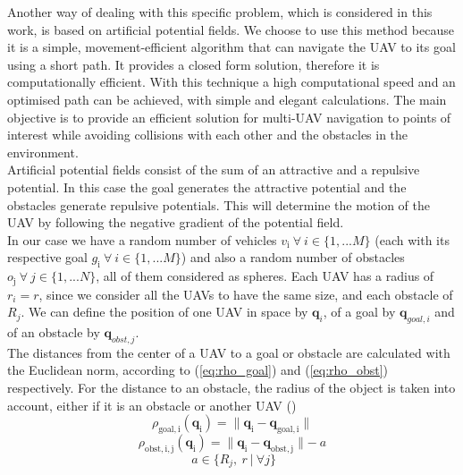 \documentclass[journal]{IEEEtran}
\newcommand*{\subb}[1]{_{\mathrm{#1}}}
\begin{document}
		Another way of dealing with this specific problem, which is considered in this work, is based on artificial potential fields. We choose to use this method because it is a simple, movement-efficient algorithm that can navigate the UAV to its goal using a short path. It provides a closed form solution, therefore it is computationally efficient. With this technique a high computational speed and an optimised path can be achieved, with simple and elegant calculations\cite{Ge2002}. The main objective is to provide an efficient solution for multi-UAV navigation to points of interest while avoiding collisions with each other and the obstacles in the environment.\\
		
		Artificial potential fields consist of the sum of an attractive and a repulsive potential. In this case the goal generates the attractive potential and the obstacles generate repulsive potentials. This will determine the motion of the UAV by following the negative gradient of the potential field. \\
		
		In our case we have a random number of vehicles $v\subb{i} \ \forall \ i \in \{1, ...M\}$ (each with its respective goal $g\subb{i} \ \forall \ i \in \{1, ...M\}$) and also a random number of obstacles $o\subb{j} \ \forall \ j \in \{1, ...N\}$, all of them considered as spheres. Each UAV has a radius of $r_i = r$, since we consider all the UAVs to have the same size, and each obstacle of $R_j$. We can define the position of one UAV in space by $\bm{q}_i $, of a goal by $\bm{q}_{goal,i}$ and of an obstacle by $\bm{q}_{obst,j} $.\\
		
		The distances from the center of a UAV to a goal or obstacle are calculated with the Euclidean norm, according to (\ref{eq:rho_goal}) and (\ref{eq:rho_obst}) respectively. For the distance to an obstacle, the radius of the object is taken into account, either if it is an obstacle or another UAV ()
		\begin{equation} \label{eq:rho_goal}
		\rho\subb{goal, i}(\bm{q}\subb{i}) = \parallel \bm{q}\subb{i} - \bm{q}\subb{goal,i}\parallel
		\end{equation}
		\begin{equation} \label{eq:rho_obst}
		\rho\subb{obst, i, j}(\bm{q}\subb{i}) = \parallel \bm{q}\subb{i} - \bm{q}\subb{obst, j}\parallel - \ a
		\end{equation}
		\begin{equation} \label{eq:a_def}
		\ a \in \{R_j, \ r\ |\ \forall j\}
		\end{equation}
		
\end{document}
